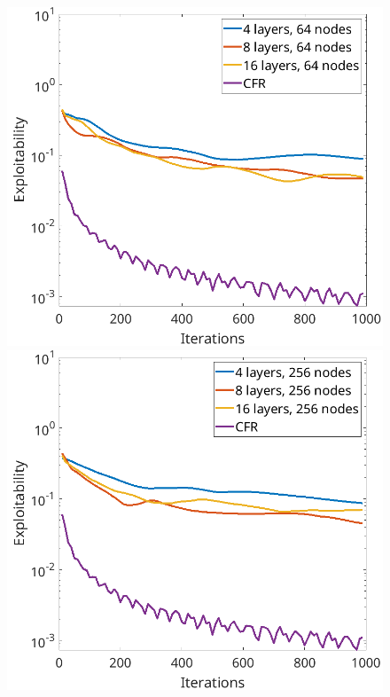 \documentclass[10pt,a4paper]{article}
\begin{document}
\FloatBarrier
\begin{figure}[h]
\includegraphics[scale=0.26]{Figures/rcfr_kuhn_parameters1.png}
\includegraphics[scale=0.26]{Figures/rcfr_kuhn_parameters2.png}

\end{figure}
\end{document}
